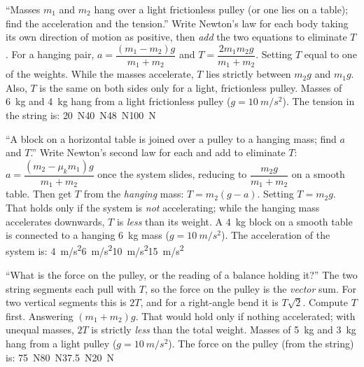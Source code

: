 {``Masses $m_1$ and $m_2$ hang over a light frictionless pulley (or one lies on a table); find the
acceleration and the tension.''}
{Write Newton's law for each body taking its own direction of motion as positive, then \emph{add} the
two equations to eliminate $T$. For a hanging pair, $a=\dfrac{(m_1-m_2)g}{m_1+m_2}$ and
$T=\dfrac{2m_1m_2g}{m_1+m_2}$.}
{Setting $T$ equal to one of the weights. While the masses accelerate, $T$ lies strictly between $m_2g$
and $m_1g$. Also, $T$ is the same on both sides only for a light, frictionless pulley.}
{Masses of \SI{6}{kg} and \SI{4}{kg} hang from a light frictionless pulley ($g=\SI{10}{m/s^2}$). The
tension in the string is:}
{\SI{20}{N}}{\SI{40}{N}}{\SI{48}{N}}{\SI{100}{N}}

{``A block on a horizontal table is joined over a pulley to a hanging mass; find $a$ and $T$.''}
{Write Newton's second law for each and add to eliminate $T$:
$a=\dfrac{(m_2-\mu_k m_1)g}{m_1+m_2}$ once the system slides, reducing to $\dfrac{m_2g}{m_1+m_2}$ on a smooth table. Then get $T$
from the \emph{hanging} mass: $T=m_2(g-a)$.}
{Setting $T=m_2g$. That holds only if the system is \emph{not} accelerating; while the hanging mass
accelerates downwards, $T$ is \emph{less} than its weight.}
{A \SI{4}{kg} block on a smooth table is connected to a hanging \SI{6}{kg} mass ($g=\SI{10}{m/s^2}$).
The acceleration of the system is:}
{\SI{4}{m/s^2}}{\SI{6}{m/s^2}}{\SI{10}{m/s^2}}{\SI{15}{m/s^2}}

{``What is the force on the pulley, or the reading of a balance holding it?''}
{The two string segments each pull with $T$, so the force on the pulley is the \emph{vector} sum. For two
vertical segments this is $2T$, and for a right-angle bend it is $T\sqrt2$. Compute $T$ first.}
{Answering $(m_1+m_2)g$. That would hold only if nothing accelerated; with unequal masses, $2T$ is
strictly \emph{less} than the total weight.}
{Masses of \SI{5}{kg} and \SI{3}{kg} hang from a light pulley ($g=\SI{10}{m/s^2}$). The force on the
pulley (from the string) is:}
{\SI{75}{N}}{\SI{80}{N}}{\SI{37.5}{N}}{\SI{20}{N}}

